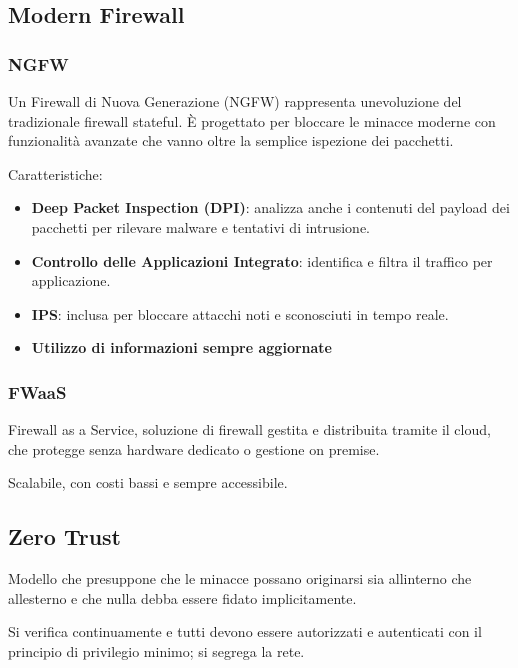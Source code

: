 \subsection{Modern Firewall}\label{modern-firewall}

\subsubsection{NGFW}\label{ngfw}

Un Firewall di Nuova Generazione (NGFW) rappresenta
un\textquotesingle evoluzione del tradizionale firewall stateful. È
progettato per bloccare le minacce moderne con funzionalità avanzate che
vanno oltre la semplice ispezione dei pacchetti.

Caratteristiche:

\begin{itemize}
\item
  \textbf{Deep Packet Inspection (DPI)}: analizza anche i contenuti del
  payload dei pacchetti per rilevare malware e tentativi di intrusione.
\item
  \textbf{Controllo delle Applicazioni Integrato}: identifica e filtra
  il traffico per applicazione.
\item
  \textbf{IPS}: inclusa per bloccare attacchi noti e sconosciuti in
  tempo reale.
\item
  \textbf{Utilizzo di informazioni sempre aggiornate}
\end{itemize}

\subsubsection{FWaaS}\label{fwaas}

Firewall as a Service, soluzione di firewall gestita e distribuita
tramite il cloud, che protegge senza hardware dedicato o gestione on
premise.

Scalabile, con costi bassi e sempre accessibile.

\subsection{Zero Trust}\label{zero-trust}

Modello che presuppone che le minacce possano originarsi sia
all\textquotesingle interno che all\textquotesingle esterno e che nulla
debba essere fidato implicitamente.

Si verifica continuamente e tutti devono essere autorizzati e
autenticati con il principio di privilegio minimo; si segrega la rete.

